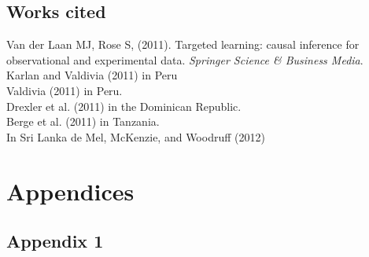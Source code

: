 \section{Works cited}
\label{sec:works-cited}



Van der Laan MJ, Rose S, (2011). Targeted learning: causal inference for observational and experimental data.\emph{ Springer Science \& Business Media}.\\

Karlan and Valdivia (2011) in Peru\\

Valdivia (2011) in Peru. \\

Drexler et al. (2011) in the Dominican Republic. \\

Berge et al. (2011) in Tanzania. \\

In Sri Lanka de Mel, McKenzie, and Woodruff (2012) \\

\pagebreak

\chapter{Appendices}
\label{cha:appendices}

\section{Appendix 1}
\label{sec:appendix-1}








